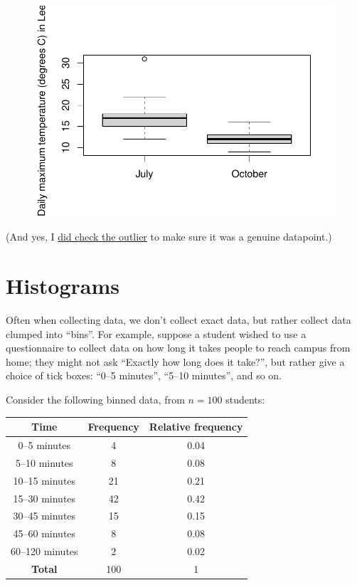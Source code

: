 \documentclass[
  letterpaper,
  DIV=11,
  numbers=noendperiod]{scrreprt}
\theoremstyle{remark}
\begin{document}
\begin{figure}[H]

{\centering \includegraphics{sections/L02-dataviz_files/figure-pdf/boxplot-temp-1.pdf}

}

\end{figure}

(And yes, I
\href{https://www.metoffice.gov.uk/binaries/content/assets/metofficegovuk/pdf/weather/learn-about/uk-past-events/interesting/2020/2020_05_july_temperature.pdf}{did
check the outlier} to make sure it was a genuine datapoint.)

\hypertarget{histograms}{%
\section{Histograms}\label{histograms}}

Often when collecting data, we don't collect exact data, but rather
collect data clumped into ``bins''. For example, suppose a student
wished to use a questionnaire to collect data on how long it takes
people to reach campus from home; they might not ask ``Exactly how long
does it take?'', but rather give a choice of tick boxes: ``0--5
minutes'', ``5--10 minutes'', and so on.

Consider the following binned data, from \(n = 100\) students:

\begin{longtable}[]{@{}ccc@{}}
\toprule()
Time & Frequency & Relative frequency \\
\midrule()
\endhead
0--5 minutes & 4 & 0.04 \\
5--10 minutes & 8 & 0.08 \\
10--15 minutes & 21 & 0.21 \\
15--30 minutes & 42 & 0.42 \\
30--45 minutes & 15 & 0.15 \\
45--60 minutes & 8 & 0.08 \\
60--120 minutes & 2 & 0.02 \\
\textbf{Total} & 100 & 1 \\
\bottomrule()
\end{longtable}
\end{document}
